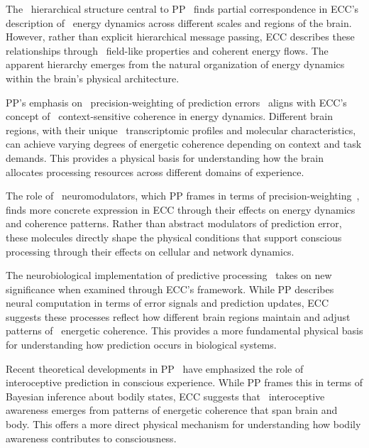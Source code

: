 The~ hierarchical structure central to PP~\cite{Hohwy2013, Wiese2017} finds partial correspondence in ECC's description of~ energy dynamics across different scales and regions of the brain. However, rather than explicit hierarchical message passing, ECC describes these relationships through~ field-like properties and coherent energy flows. The apparent hierarchy emerges from the natural organization of energy dynamics within the brain's physical architecture.

PP's emphasis on~ precision-weighting of prediction errors~\cite{Hohwy2008, Friston2020} aligns with ECC's concept of~ context-sensitive coherence in energy dynamics. Different brain regions, with their unique~ transcriptomic profiles and molecular characteristics, can achieve varying degrees of energetic coherence depending on context and task demands. This provides a physical basis for understanding how the brain allocates processing resources across different domains of experience.

The role of~ neuromodulators, which PP frames in terms of precision-weighting~\cite{Seth2014, Friston2009}, finds more concrete expression in ECC through their effects on energy dynamics and coherence patterns. Rather than abstract modulators of prediction error, these molecules directly shape the physical conditions that support conscious processing through their effects on cellular and network dynamics.

The neurobiological implementation of predictive processing~\cite{Rao1999, Friston2010} takes on new significance when examined through ECC's framework. While PP describes neural computation in terms of error signals and prediction updates, ECC suggests these processes reflect how different brain regions maintain and adjust patterns of~ energetic coherence. This provides a more fundamental physical basis for understanding how prediction occurs in biological systems.

Recent theoretical developments in PP~\cite{Seth2012, Seth2021} have emphasized the role of~ interoceptive prediction in conscious experience. While PP frames this in terms of Bayesian inference about bodily states, ECC suggests that~ interoceptive awareness emerges from patterns of energetic coherence that span brain and body. This offers a more direct physical mechanism for understanding how bodily awareness contributes to consciousness.

